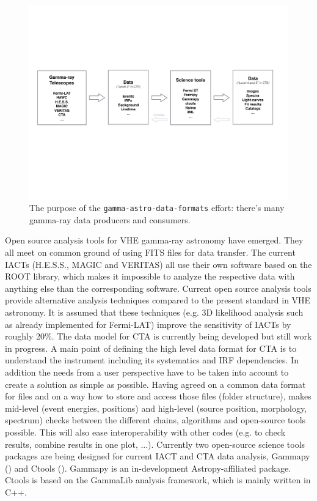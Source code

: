 \begin{figure}[tb]
  \centerline{\includegraphics[width=\textwidth]{figures/purpose}}
  \caption{The purpose of the \texttt{gamma-astro-data-formats} effort: there's
  many gamma-ray data producers and consumers.}
  \label{fig:purpose}
\end{figure}

Open source analysis tools for VHE gamma-ray astronomy have emerged. They all meet on common ground of using FITS files for data transfer. The current IACTs (H.E.S.S., MAGIC and VERITAS) all use their own software based on the ROOT library, which makes it impossible to analyze the respective data with anything else than the corresponding software. Current open source analysis tools provide alternative analysis techniques compared to the present standard in VHE astronomy. It is assumed that these techniques (e.g. 3D likelihood analysis such as already implemented for Fermi-LAT) improve the sensitivity of IACTs by roughly 20\%. The data model for CTA is currently being developed but still work in progress. A main point of defining the high level data format for CTA is to understand the instrument including its systematics and IRF dependencies. In addition the needs from a user perspective have to be taken into account to create a solution as simple as possible. Having agreed on a common data format for files and on a way how to store and access those files (folder structure), makes mid-level (event energies, positions) and high-level (source position, morphology, spectrum) checks between the different chains, algorithms and open-source tools possible. This will also ease interoperability with other codes (e.g. to check results, combine results in one plot, ...). Currently two open-source science tools packages are being designed for current IACT and CTA data analysis, Gammapy (\cite{2015arXiv150907408D}) and Ctools (\cite{2016AnA...593A...1K}). Gammapy is an in-development Astropy-affiliated package. Ctools is based on the GammaLib analysis framework, which is mainly written in C++.

